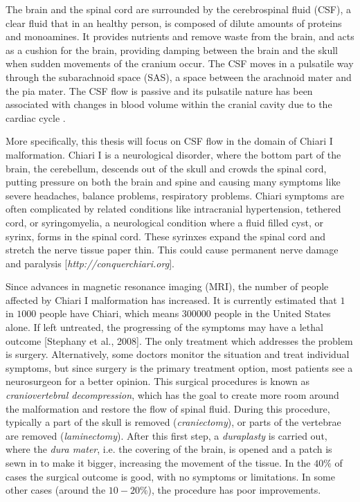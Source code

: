\documentclass[a4paper,11pt,openright,twoside]{book}
\begin{document}
The brain and the spinal cord are surrounded by the cerebrospinal fluid (CSF), a clear fluid that in an healthy person, is composed of dilute amounts of proteins and monoamines. It provides nutrients and remove waste from the brain, and acts as a cushion for the brain, providing damping between the brain and the skull when sudden movements of the cranium occur. The CSF moves in a pulsatile way through the subarachnoid space (SAS), a space between the arachnoid mater and the pia mater. The CSF flow is passive and its pulsatile nature has been associated with changes in blood volume within the cranial cavity due to the cardiac cycle \cite{silverthorn}.

More specifically, this thesis will focus on CSF flow in the domain of Chiari I malformation. Chiari I is a neurological disorder, where the bottom part of the brain, the cerebellum, descends out of the skull and crowds the spinal cord, putting pressure on both the brain and spine and causing many symptoms like severe headaches, balance problems, respiratory problems. Chiari symptoms are often complicated by related conditions like intracranial hypertension, tethered cord, or syringomyelia, a neurological condition where a fluid filled cyst, or syrinx, forms in the spinal cord. These syrinxes expand the spinal cord and stretch the nerve tissue paper thin. This could cause permanent nerve damage and paralysis [\emph{http://conquerchiari.org}].

Since advances in magnetic resonance imaging (MRI), the number of people affected by Chiari I malformation has increased. It is currently estimated that $1$ in $1000$ people have Chiari, which means $300000$ people in the United States alone. If left untreated, the progressing of the symptoms may have a lethal outcome [Stephany et al., 2008]. The only treatment which addresses the problem is surgery. Alternatively, some doctors monitor the situation and treat individual symptoms, but since surgery is the primary treatment option, most patients see a neurosurgeon for a better opinion. This surgical procedures is known as \textit{craniovertebral decompression}, which has the goal to create more room around the malformation and restore the flow of spinal fluid. During this procedure, typically a part of the skull is removed (\textit{craniectomy}), or parts of the vertebrae are removed (\textit{laminectomy}). After this first step, a \textit{duraplasty} is carried out, where the \textit{dura mater}, i.e. the covering of the brain, is opened and a patch is sewn in to make it bigger, increasing the movement of the tissue.
In the $40 \%$ of cases the surgical outcome is good, with no symptoms or limitations. In some other cases (around the $10-20 \%$), the procedure has poor improvements. 
\end{document}
